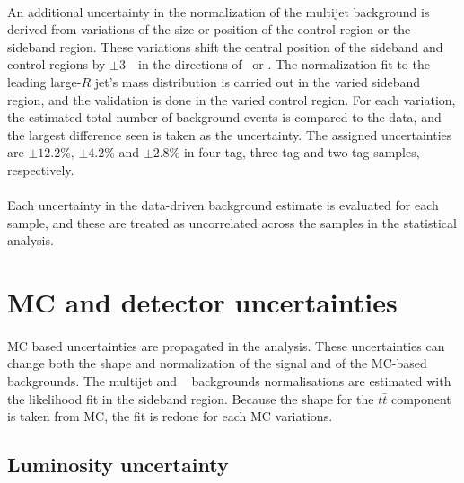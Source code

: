 \paragraph{}
An additional uncertainty in the normalization of the multijet background is derived from variations of the size or position of the control region or the sideband region. These variations shift the central position of the sideband and control regions by $\pm3$~\GeV\ in the directions of \mleadJ\ or \msublJ. The normalization fit to the leading large-$R$ jet's mass distribution is carried out in the varied sideband region, and the validation is done in the varied control region. For each variation, the estimated total number of background events is compared to the data, and the largest difference seen is taken as the uncertainty. The assigned uncertainties are $\pm12.2$\%, $\pm4.2$\% and $\pm2.8$\% in four-tag, three-tag and two-tag samples, respectively.

\paragraph{}
Each uncertainty in the data-driven background estimate is evaluated for each sample, and these are treated as uncorrelated across the samples in the statistical analysis.




\section{MC and detector uncertainties}
\paragraph{}
MC based uncertainties are propagated in the analysis. 
These uncertainties can change both the shape and normalization of the signal and of the MC-based backgrounds. 
The multijet and \ttbar~ backgrounds normalisations are estimated with the likelihood fit in the sideband region. 
Because the shape for the $t\bar{t}$ component is taken from MC, the fit is redone for each MC variations.

\subsection{Luminosity uncertainty} 
